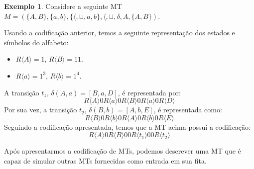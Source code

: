 \documentclass[a4paper]{article}
\theoremstyle{definition}
\newtheorem{Example}{Exemplo}
\begin{document}
  \begin{Example}
    Considere a seguinte MT $M = (\{A,B\},\{a,b\},\{\langle, \sqcup,
    a,b\},\langle, \sqcup, \delta, A, \{A,B\})$.
    \begin{figure}[H]
      \centering
    \end{figure}
    Usando a codificação anterior, temos a seguinte representação dos estados e
    símbolos do alfabeto:
    \begin{itemize}
      \item $R\langle A \rangle = 1$, $R\langle B \rangle = 11$.
      \item $R\langle a \rangle = 1^3$, $R\langle b \rangle = 1^4$.
    \end{itemize}
    A transição $t_1$, $\delta(A,a) = [B,a,D]$, é representada por:
    \[
      R\langle A \rangle 0 R\langle a \rangle 0 R\langle B \rangle 0 R\langle a
      \rangle 0 R\langle D \rangle
    \]
    Por sua vez, a transição $t_2$, $\delta(B,b) = [A,b,E]$, é representada como:
    \[
      R\langle B \rangle 0 R\langle b \rangle 0 R\langle A \rangle 0 R\langle b
      \rangle 0 R\langle E \rangle
    \]
    Seguindo a codificação apresentada, temos que a MT acima possui a
    codificação:
    \[
      R\langle A \rangle 0 R\langle B \rangle 00 R\langle t_1 \rangle 00 R\langle t_2 \rangle
    \]
  \end{Example}

  Após apresentarmos a codificação de MTs, podemos descrever uma MT que é capaz
  de simular outras MTs fornecidas como entrada em sua fita.
\end{document}
